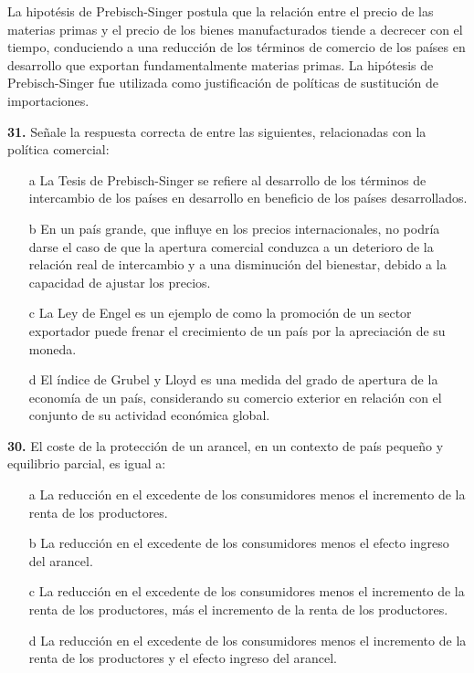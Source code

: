 \documentclass{nuevotema}
\begin{document}
\conceptos


La hipotésis de Prebisch-Singer postula que la relación entre el precio de las materias primas y el precio de los bienes manufacturados tiende a decrecer con el tiempo, conduciendo a una reducción de los términos de comercio de los países en desarrollo que exportan fundamentalmente materias primas. La hipótesis de Prebisch-Singer fue utilizada como justificación de políticas de sustitución de importaciones.

\preguntas


\textbf{31.} Señale la respuesta correcta de entre las siguientes, relacionadas con la política comercial:

\begin{itemize}
	\item[a] La Tesis de Prebisch-Singer se refiere al desarrollo de los términos de intercambio de los países en desarrollo en beneficio de los países desarrollados.
	\item[b] En un  país grande, que influye en los precios internacionales, no podría darse el caso de que la apertura comercial conduzca a un deterioro de la relación real de intercambio y a una disminución del bienestar, debido a la capacidad de ajustar los precios.
	\item[c] La Ley de Engel es un ejemplo de como la promoción de un sector exportador puede frenar el crecimiento de un país por la apreciación de su moneda.
	\item[d] El índice de Grubel y Lloyd es una medida del grado de apertura de la economía de un país, considerando su comercio exterior en relación con el conjunto de su actividad económica global.
\end{itemize}


\textbf{30.} El coste de la protección de un arancel, en un contexto de país pequeño y equilibrio parcial, es igual a:

\begin{itemize}
	\item[a] La reducción en el excedente de los consumidores menos el incremento de la renta de los productores.
	\item[b] La reducción en el excedente de los consumidores menos el efecto ingreso del arancel.
	\item[c] La reducción en el excedente de los consumidores menos el incremento de la renta de los productores, más el incremento de la renta de los productores.
	\item[d] La reducción en el excedente de los consumidores menos el incremento de la renta de los productores y el efecto ingreso del arancel.
\end{itemize}
\end{document}
